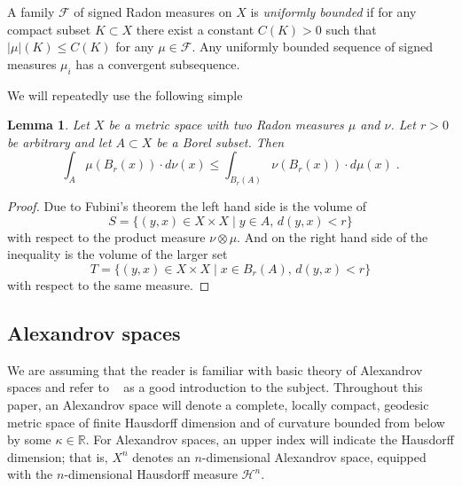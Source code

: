 \documentclass[12pt,leqno]{amsart}
\numberwithin{equation}{section}
\newtheorem{lem}[thm]{Lemma}
\theoremstyle{definition}
\theoremstyle{remark}
\newcommand{\vol}{\mathrm{vol}}
\newcommand{\R}{\mathbb{R}}
\begin{document}

 A family   $\mathcal F$ of signed  Radon measures on $X$  is \emph{uniformly bounded} if  for any compact subset $K\subset X$ there exist a constant $C(K)>0$ such that $|\mu| (K) \leq C(K)$ for any $\mu \in \mathcal F$.
   Any uniformly bounded sequence of signed measures $\mu _i$  has a convergent subsequence.


We will repeatedly use the following simple


\begin{lem} \label{lem:exchange}
Let $X$ be a metric space with two Radon measures $\mu $ and $\nu$. Let $r>0$ be arbitrary and let  $A\subset X$ be a Borel subset. Then
 $$\int _A \mu (B_r(x)) \cdot d\nu (x) \leq \int _{B_r (A)}  \nu (B_r (x)) \cdot d\mu (x) \; .$$
\end{lem}

\begin{proof} Due to  Fubini's theorem
the left  hand side is the volume of  $$S=\{(y,x) \in X\times X \;| \;  y \in A,\, d(y,x) <r \}$$ with respect to the product measure $\nu \otimes \mu$.
And on the right  hand side of the inequality is the volume of the larger set $$T=\{(y,x) \in  X\times X \; | \; x\in B_r(A), \, d(y,x)<r \}$$ with respect to the same measure.
\end{proof}

\subsection{Alexandrov spaces} \label{subsec:Alex}
We are assuming that the reader is familiar with basic theory of Alexandrov spaces and  refer to ~\cite{BGP} as a good introduction to the subject.
Throughout this paper, an Alexandrov space will denote a complete, locally compact, geodesic metric space of finite Hausdorff dimension and of curvature bounded from below by some $\kappa \in \R$.
 For Alexandrov spaces, an upper index will indicate the Hausdorff dimension; that is, $X^n$ denotes an $n$-dimensional Alexandrov space, equipped with the $n$-dimensional Hausdorff measure $\mathcal H^n$.
\end{document}
